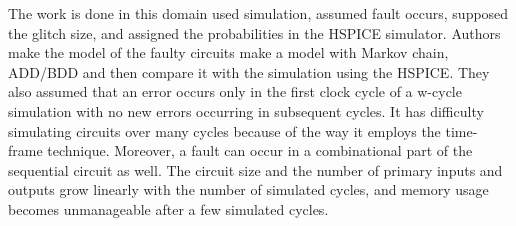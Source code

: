 The work is done in this domain used simulation, assumed fault occurs, supposed the glitch size, and assigned the
probabilities in the HSPICE simulator. Authors make the model of the faulty circuits make a model with Markov chain, ADD/BDD and then compare it with the simulation using the
HSPICE. They also assumed that an error occurs only in the first clock cycle of a w-cycle simulation with
no new errors occurring in subsequent cycles. It has difficulty simulating circuits over many cycles
because of the way it employs the time-frame technique. Moreover, a fault can occur in a combinational part of the sequential circuit as well. The circuit size and the number of primary
inputs and outputs grow linearly with the number of simulated cycles, and memory usage becomes
unmanageable after a few simulated cycles.









\label{related}





